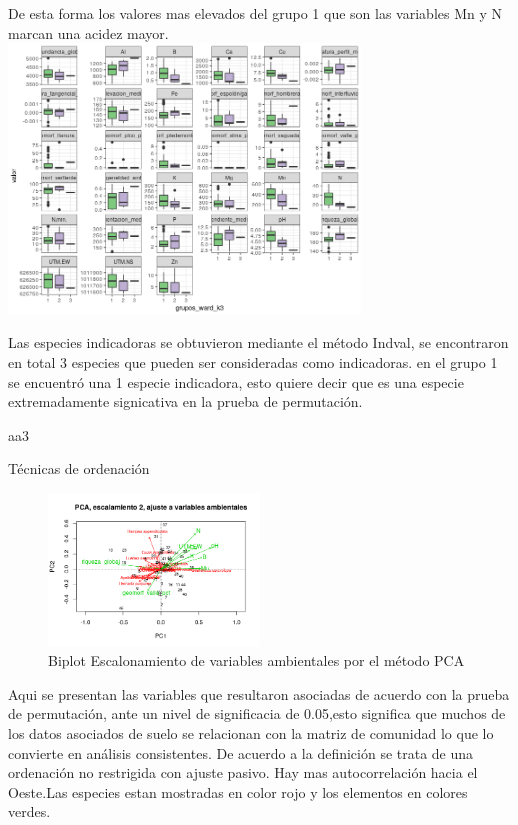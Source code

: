 \documentclass[11pt,]{article}
\begin{document}
De esta forma los valores mas elevados del grupo 1 que son las variables
Mn y N marcan una acidez mayor.
\includegraphics[width=0.70000\textwidth]{variables_ambientales.png}

Las especies indicadoras se obtuvieron mediante el método Indval, se
encontraron en total 3 especies que pueden ser consideradas como
indicadoras. en el grupo 1 se encuentró una 1 especie indicadora, esto
quiere decir que es una especie extremadamente signicativa en la prueba
de permutación.

aa3

Técnicas de ordenación

\begin{figure}
\centering
\includegraphics[width=0.50000\textwidth]{Escalonamiento_ajustado_variables_ambientales_PCA.png}
\caption{Biplot Escalonamiento de variables ambientales por el método
PCA}
\end{figure}

Aqui se presentan las variables que resultaron asociadas de acuerdo con
la prueba de permutación, ante un nivel de significacia de 0.05,esto
significa que muchos de los datos asociados de suelo se relacionan con
la matriz de comunidad lo que lo convierte en análisis consistentes. De
acuerdo a la definición se trata de una ordenación no restrigida con
ajuste pasivo. Hay mas autocorrelación hacia el Oeste.Las especies estan
mostradas en color rojo y los elementos en colores verdes.
\end{document}
